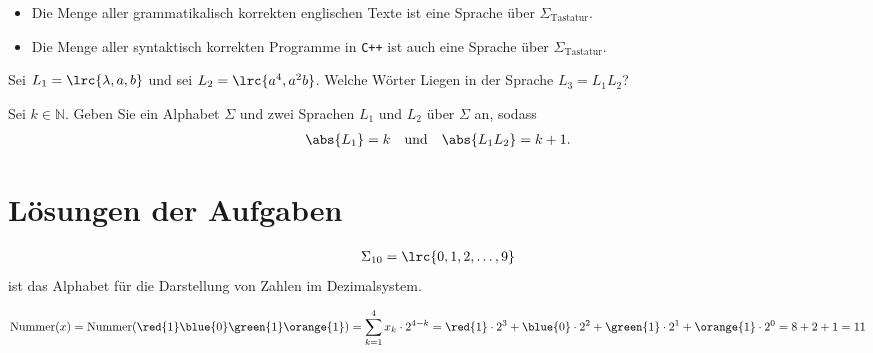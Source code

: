 \begin{myexample}\phantom{1}
\begin{itemize}
	\item Die Menge aller grammatikalisch korrekten englischen Texte ist eine Sprache über $\Sigma_{\text{Tastatur}}$.
	\item Die Menge aller syntaktisch korrekten Programme in {\tt C++} ist auch eine Sprache über $\Sigma_{\text{Tastatur}}$.
\end{itemize}
\end{myexample}

\begin{myexercise}\label{myexercise:0208}
	Sei $L_1 = \lrc{\lambda, a, b}$ und sei $L_2 = \lrc{a^4, a^2b}$. Welche Wörter Liegen in der Sprache $L_3 = L_1L_2$?
\end{myexercise}

\begin{mychallenge}\label{mychallenge:0209}
	Sei $k\in\mathbb{N}$. Geben Sie ein Alphabet $\Sigma$ und zwei Sprachen $L_1$ und $L_2$ über $\Sigma$ an, sodass
	\begin{align*}
		\abs{L_1} = k\quad \text{und} \quad \abs{L_1L_2} = k + 1.
	\end{align*}
\end{mychallenge}


\clearpage
\section{Lösungen der Aufgaben}
\begin{myanswer}[myexercise:0200]
	\begin{align*}
		\Sigma_{10} = \lrc{0,1,2,\ldots ,9}
	\end{align*}
	ist das Alphabet für die Darstellung von Zahlen im Dezimalsystem.
\end{myanswer}


\begin{myanswer}[myexercise:0298]
	\begin{align*}
		\text{Nummer}(x) = \text{Nummer}(\red{1}\blue{0}\green{1}\orange{1}) = \displaystyle\sum_{k=1}^4 x_k\cdot 2^{4-k} = \red{1}\cdot 2^3+\blue{0}\cdot 2^2 + \green{1}\cdot 2^1+\orange{1}\cdot 2^0 = 8 + 2 + 1 = 11
	\end{align*}
\end{myanswer}


